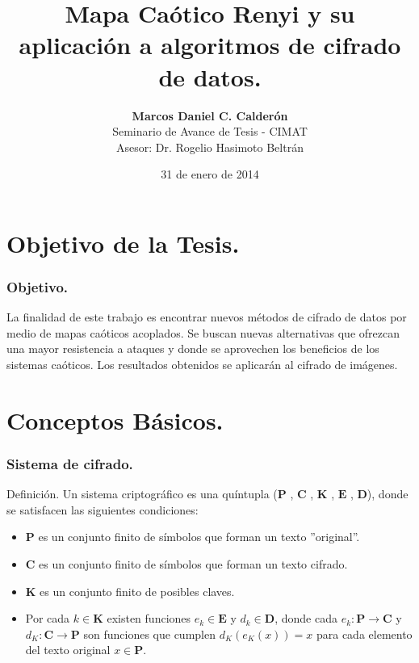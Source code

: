 \documentclass[xcolor=table]{beamer}
\begin{document}
\title{Mapa Caótico Renyi y su aplicación a algoritmos de cifrado de datos.\\}

\author{   {\bf        Marcos Daniel C. Calderón}      \\ 
{Seminario de Avance de Tesis  -  CIMAT}\\ 
{Asesor: Dr. Rogelio Hasimoto Beltrán}\\
\vspace*{0.5cm}}
\date{31 de enero de 2014}
\frame{\titlepage}

\section{Objetivo de la Tesis.}

\begin{frame}
\frametitle{Objetivo.}
La finalidad de este trabajo es encontrar nuevos métodos de cifrado de datos por medio de mapas caóticos acoplados. Se buscan nuevas alternativas que ofrezcan una mayor resistencia a ataques y donde se aprovechen los beneficios de los sistemas caóticos. Los resultados obtenidos se aplicarán al cifrado de imágenes. 
\end{frame}


\section{Conceptos Básicos.}

\begin{frame}
\frametitle{Sistema de cifrado.}

\begin{block}{Definición.}
Un sistema criptográfico es una quíntupla ($\mathbf{P}$ , $\mathbf{C}$ ,  $\mathbf{K}$ , $\mathbf{E}$ , $\mathbf{D}$), donde se satisfacen las siguientes condiciones:
\begin{itemize}
\item $\mathbf{P} $ es un conjunto finito de símbolos que forman un texto ''original''.
\item $\mathbf{C} $ es un conjunto finito de símbolos que forman un texto cifrado.
\item $\mathbf{K} $ es un conjunto finito de posibles claves.
\item Por cada $k \in \mathbf{K}$ existen funciones $e_{k} \in \mathbf{E}$  y $ d_{k} \in \mathbf{D}$, donde  cada $e_{k}: \mathbf{P} \rightarrow \mathbf{C}$ y $ d_{K}:  \mathbf{C} \rightarrow \mathbf{P}$ son funciones  que cumplen $d_{K}(e_{K}(x))=x$ para cada elemento del texto original $x \in \mathbf{P}$.
\end{itemize}
\end{block}
\end{frame}
\end{document}
